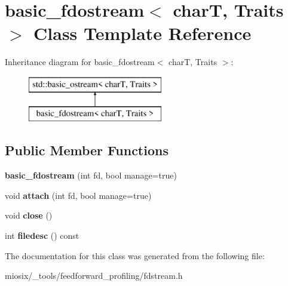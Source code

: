 \hypertarget{classbasic__fdostream}{\section{basic\-\_\-fdostream$<$ char\-T, Traits $>$ Class Template Reference}
\label{classbasic__fdostream}
}
Inheritance diagram for basic\-\_\-fdostream$<$ char\-T, Traits $>$\-:\begin{figure}[H]
\begin{center}
\leavevmode
\includegraphics[height=2.000000cm]{classbasic__fdostream}
\end{center}
\end{figure}
\subsection*{Public Member Functions}
\begin{DoxyCompactItemize}
\item 
\hypertarget{classbasic__fdostream_abb4a2f209f2336ec0e08ba0524ab5988}{{\bfseries basic\-\_\-fdostream} (int fd, bool manage=true)}\label{classbasic__fdostream_abb4a2f209f2336ec0e08ba0524ab5988}

\item 
\hypertarget{classbasic__fdostream_a22369a267ad6ca7ba23ae87066134642}{void {\bfseries attach} (int fd, bool manage=true)}\label{classbasic__fdostream_a22369a267ad6ca7ba23ae87066134642}

\item 
\hypertarget{classbasic__fdostream_a6881a9a2ce9a795af08bc06bc5e89dce}{void {\bfseries close} ()}\label{classbasic__fdostream_a6881a9a2ce9a795af08bc06bc5e89dce}

\item 
\hypertarget{classbasic__fdostream_ad045c3eacfc8affb766e83a513ddb325}{int {\bfseries filedesc} () const }\label{classbasic__fdostream_ad045c3eacfc8affb766e83a513ddb325}

\end{DoxyCompactItemize}


The documentation for this class was generated from the following file\-:\begin{DoxyCompactItemize}
\item 
miosix/\-\_\-tools/feedforward\-\_\-profiling/fdstream.\-h\end{DoxyCompactItemize}
